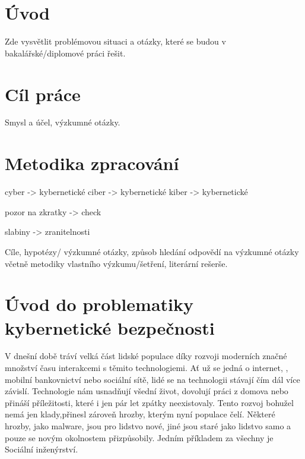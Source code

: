 \section{Úvod}\label{sec:uvod}


Zde vysvětlit problémovou situaci a otázky, které se budou v bakalářské/diplomové práci řešit.

\section{Cíl práce}\label{sec:cil-prace}


Smysl a účel, výzkumné otázky.

\section{Metodika zpracování}\label{sec:metodika-zpracovani}


cyber -> kybernetické
ciber -> kybernetické
kiber -> kybernetické

pozor na zkratky -> check

slabiny -> zranitelnosti



Cíle, hypotézy/ výzkumné otázky, způsob hledání odpovědí na výzkumné otázky včetně metodiky vlastního výzkumu/šetření, literární rešerše.

\section{Úvod do problematiky kybernetické bezpečnosti}\label{sec:uvod-do-problematiky-kyberneticke-bezpecnosti}
V dnešní době tráví velká část lidské populace díky rozvoji moderních značné množství času interakcemi s těmito technologiemi.
Ať už se jedná o internet, , mobilní bankovnictví nebo sociální sítě, lidé se na technologii stávají čím dál více závislí.
Technologie nám usnadňují všední život, dovolují práci z domova nebo přináší příležitosti, které i jen pár let zpátky neexistovaly.
Tento rozvoj bohužel nemá jen klady,přinesl zároveň hrozby, kterým nyní populace čelí.
Některé hrozby, jako malware, jsou pro lidstvo nové, jiné jsou staré jako lidstvo samo a pouze se novým okolnostem přizpůsobily.
Jedním příkladem za všechny je Sociální inženýrství.

